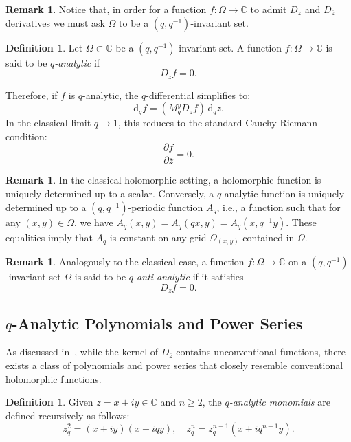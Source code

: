 \documentclass[10pt]{amsart}
\theoremstyle{plain}
\theoremstyle{definition}
\newtheorem{definition}[theorem]{Definition}
\newtheorem{remark}[theorem]{Remark}
\renewcommand{\bar}[1]{\overline{#1}}
\begin{document}
\begin{remark}
Notice that, in order for a function $f:\Omega\to\mathbb{C}$ to admit $D_{z}$ and $D_{\bar z}$ derivatives we must ask $\Omega$ to be a $(q,q^{-1})$-invariant set.
\end{remark}




\begin{definition}
Let $\Omega\subset\mathbb{C}$ be a $(q,q^{-1})$-invariant set.
A function $ f : \Omega \to \mathbb{C} $ is said to be \textit{$q$-analytic} if
\[
D_{\bar{z}} f = 0.
\]
\end{definition}
Therefore, if $f$ is $q$-analytic, the $q$-differential simplifies to:
\[
\mathrm{d}_q f = \left( M_q^y D_z f \right)\, \mathrm{d}_q z.
\]
In the classical limit $ q \to 1 $, this reduces to the standard Cauchy-Riemann condition:
\[
\frac{\partial f}{\partial \bar{z}} = 0.
\]

\begin{remark}
In the classical holomorphic setting, a holomorphic function is uniquely determined up to a scalar. Conversely, a $q$-analytic function is uniquely determined up to a $(q,q^{-1})$-periodic function $A_{q}$, i.e., a function such that for any $(x,y)\in\Omega$, we have $A_{q}(x,y)=A_{q}(qx,y)=A_{q}(x,q^{-1}y)$.
These equalities imply that $A_{q}$ is constant on any grid $\Omega_{(x,y)}$ contained in $\Omega$.
\end{remark}

\begin{remark}
Analogously to the classical case, a function $ f : \Omega \to \mathbb{C} $ on a $(q,q^{-1})$-invariant set $\Omega$ is said to be \textit{$q$-anti-analytic} if it satisfies
\[
D_z f = 0.
\]
\end{remark}

\subsection{$q$-Analytic Polynomials and Power Series}
As discussed in~\cite{Am}, while the kernel of $D_{\bar{z}}$ contains unconventional functions, there exists a class of polynomials and power series that closely resemble conventional holomorphic functions.

\begin{definition}
Given $z = x + iy \in \mathbb{C}$ and $n \geq 2$, the \textit{$q$-analytic monomials} are defined recursively as follows:
\[
z_q^2 = (x + iy)(x + iqy), \quad z_q^n = z_q^{n-1}(x + iq^{n-1}y).
\]

\end{definition}
\end{document}
